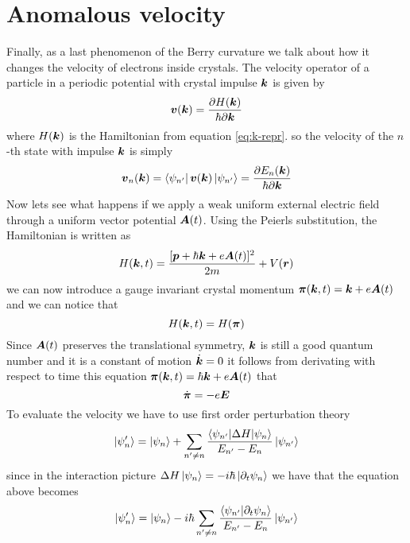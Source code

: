 \section{Anomalous velocity}
Finally, as a last phenomenon of the Berry curvature we talk about how it changes the velocity of electrons inside crystals. The velocity operator of a particle in a periodic potential with crystal impulse $\boldsymbol{k}$ is given by \cite{grosso2013solid}
\begin{equation}
    \boldsymbol{v}(\boldsymbol{k})= \frac{\partial H(\boldsymbol{k})}{\hbar \partial \boldsymbol{k}}
    \label{eq:cryspeed}
\end{equation}
where $H(\boldsymbol{k})$ is the Hamiltonian from equation \ref{eq:k-repr}. so the velocity of the $n$-th state with impulse $\boldsymbol{k}$ is simply
\begin{equation}
    \boldsymbol{v}_n(\boldsymbol{k})=\bra{\psi_{n'}}\boldsymbol{v}(\boldsymbol{k})\ket{\psi_{n'}}=\frac{\partial E_n(\boldsymbol{k})}{\hbar \partial \boldsymbol{k}}
\end{equation}
Now lets see what happens if we apply a weak uniform external electric field through a uniform vector potential $\boldsymbol{A}(t)$. Using the Peierls substitution, the Hamiltonian is written as 
\begin{equation}
    H(\boldsymbol{k},t)= \frac{[\boldsymbol{p}+\hbar\boldsymbol{k} +e\boldsymbol{A}(t)]^2}{2m}+V(\boldsymbol{r})
\end{equation}
we can now introduce a gauge invariant crystal momentum $\boldsymbol{\pi}(\boldsymbol{k}, t)=\boldsymbol{k} +e\boldsymbol{A}(t)$ and we can notice that
\begin{equation}
    H(\boldsymbol{k},t)=H(\boldsymbol{\pi})
\end{equation}
Since $\boldsymbol{A} (t)$ preserves the translational symmetry, $\boldsymbol{k}$ is still a good quantum number and it is a constant of motion $\dot{\boldsymbol{k}}=0$ it follows from derivating with respect to time this equation $\boldsymbol{\pi}(\boldsymbol{k}, t)=\hbar \boldsymbol{k} +e\boldsymbol{A}(t)$ that
\begin{equation}
   \dot{\boldsymbol{\pi}}=-e \boldsymbol{E}
   \label{eq:pidt}
\end{equation}
To evaluate the velocity we have to use first order perturbation theory
\begin{equation}
    \ket{\psi'_n}=\ket{\psi_n}+\sum_{n'\neq n}\frac{\braket{\psi_{n'}}{\Delta H|\psi_n}}{E_{n'}-E_n}\ket{\psi_{n'}}
\end{equation}
since in the interaction picture $\Delta H\ket{\psi_n}=-i\hbar\ket{\partial_t\psi_n}$
we have that the equation above becomes
\begin{equation}
    \ket{\psi'_n}=\ket{\psi_n}-i\hbar\sum_{n'\neq n}\frac{\braket{\psi_{n'}}{\partial_t\psi_n}}{E_{n'}-E_n}\ket{\psi_{n'}}
\end{equation}
